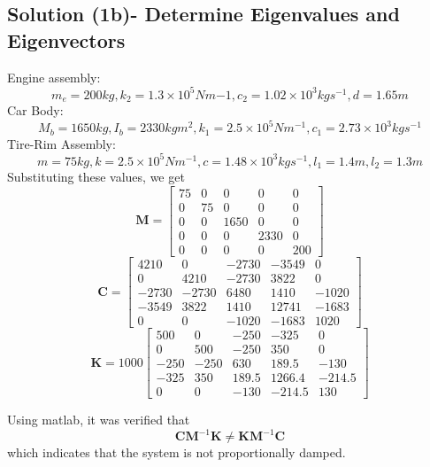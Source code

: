 \documentclass[11pt, oneside]{article}   	%
\begin{document}
\subsection{Solution (1b)- Determine Eigenvalues and Eigenvectors}
Engine assembly: $$m_e=200 kg, k_2=1.3 \times 10^5 Nm{-1}, c_2=1.02 \times 10^3 kgs^{-1}, d=1.65m$$
Car Body: $$M_b = 1650kg, I_b=2330kgm^2, k_1=2.5 \times 10^5Nm^{-1}, c_1=2.73 \times 10^3 kgs^{-1}$$
Tire-Rim Assembly: $$m=75kg, k=2.5 \times 10^5Nm^{-1}, c=1.48 \times 10^3 kgs^{-1}, l_1=1.4m, l_2=1.3m$$
Substituting these values, we get
\[ \textbf{M} = \begin{bmatrix}
75 & 0 & 0 & 0 & 0 \\
0 & 75 & 0 & 0 & 0 \\
0 & 0 & 1650 & 0 & 0 \\
0 & 0 & 0 & 2330 & 0 \\
0 & 0 & 0 & 0 & 200
\end{bmatrix} \]
\[ \textbf{C} =  \begin{bmatrix}
4210 & 0 & -2730 & -3549 & 0 \\
0 & 4210 & -2730 & 3822 & 0 \\
-2730 & -2730 & 6480 & 1410 & -1020 \\
-3549 & 3822 & 1410 & 12741  & -1683 \\
0 & 0 & -1020 & -1683 & 1020
\end{bmatrix} \]
\[ \textbf{K} =  1000 \begin{bmatrix}
500 & 0 & -250 & -325 & 0 \\
0 & 500 & -250 & 350 & 0 \\
-250 & -250 & 630 & 189.5 & -130 \\
-325 & 350 & 189.5 & 1266.4  & -214.5 \\
0 & 0 & -130 & -214.5 & 130
\end{bmatrix} \]

\noindent
Using matlab, it was verified that $$ \boldsymbol{C} \boldsymbol{M}^{-1} \boldsymbol{K} \neq \boldsymbol{K} \boldsymbol{M}^{-1} \boldsymbol{C} $$
which indicates that the system is not proportionally damped.
\end{document}
